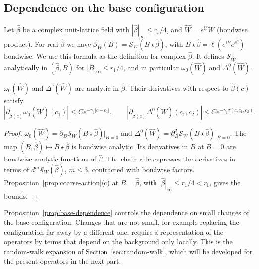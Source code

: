\subsection{Dependence on the base configuration}

Let $\hat\beta$ be a complex unit-lattice field with $|\hat\beta|_\infty\le r_1/4$, and $\hat W=e^{\ii\hat\beta}W$ (bondwise product). For real $\hat\beta$ we have $\mathcal S_{\hat W}(B)=\mathcal S_W(B\star\hat\beta)$, with $B\star\hat\beta=\ell(e^{\ii B}e^{\ii\hat\beta})$ bondwise. We use this formula as the definition for complex $\hat\beta$. It defines $\mathcal S_{\hat W}$ analytically in $(\hat\beta,B)$ for $|B|_\infty\le r_1/4$, and in particular $\omega_0(\hat W)$ and $\Delta^0(\hat W)$.

\begin{proposition}\label{prop:base-dependence}
$\omega_0(\hat W)$ and $\Delta^0(\hat W)$ are analytic in $\hat\beta$. Their derivatives with respect to $\hat\beta(c)$ satisfy
\[
|\partial_{\hat\beta(c)}\omega_0(\hat W)(c_1)|\le Ce^{-\gamma_1|c-c_1|},\qquad|\partial_{\hat\beta(c)}\Delta^0(\hat W)(c_1,c_2)|\le Ce^{-\gamma_1\tau(c,c_1,c_2)} .
\]
\end{proposition}

\begin{proof}
$\omega_0(\hat W)=\partial_B\mathcal S_W(B\star\hat\beta)|_{B=0}$ and $\Delta^0(\hat W)=\partial^2_B\mathcal S_W(B\star\hat\beta)|_{B=0}$. The map $(B,\hat\beta)\mapsto B\star\hat\beta$ is bondwise analytic. Its derivatives in $B$ at $B=0$ are bondwise analytic functions of $\hat\beta$. The chain rule expresses the derivatives in terms of $d^m\mathcal S_W(\hat\beta)$, $m\le3$, contracted with bondwise factors. Proposition~\ref{prop:coarse-action}(c) at $B=\hat\beta$, with $|\hat\beta|_\infty\le r_1/4<r_1$, gives the bounds.
\end{proof}

Proposition~\ref{prop:base-dependence} controls the dependence on small changes of the base configuration. Changes that are not small, for example replacing the configuration far away by a different one, require a representation of the operators by terms that depend on the background only locally. This is the random-walk expansion of Section~\ref{sec:random-walk}, which will be developed for the present operators in the next part.
